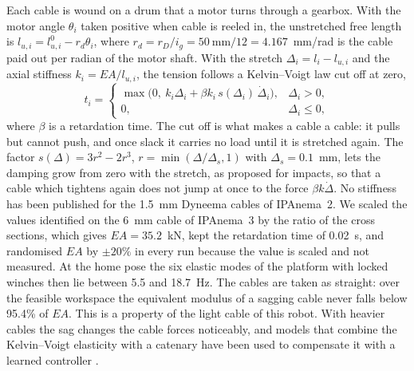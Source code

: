 \documentclass[a4paper,fleqn]{cas-dc}
\begin{document}
Each cable is wound on a drum that a motor turns through a gearbox. With the motor angle $\theta_i$ taken positive when cable is reeled in, the unstretched free length is $l_{u,i}=l^0_{u,i}-r_d\theta_i$, where $r_d=r_D/i_g=50~\text{mm}/12=4.167$~mm/rad is the cable paid out per radian of the motor shaft. With the stretch $\Delta_i=l_i-l_{u,i}$ and the axial stiffness $k_i=EA/l_{u,i}$, the tension follows a Kelvin--Voigt law cut off at zero,
\begin{equation}\label{eq:tension}
t_i=\begin{cases}\max\!\big(0,\ k_i\Delta_i+\beta k_i\,s(\Delta_i)\,\dot\Delta_i\big),&\Delta_i>0,\\ 0,&\Delta_i\le0,\end{cases}
\end{equation}
where $\beta$ is a retardation time. The cut off is what makes a cable a cable: it pulls but cannot push, and once slack it carries no load until it is stretched again. The factor $s(\Delta)=3r^2-2r^3$, $r=\min(\Delta/\Delta_s,1)$ with $\Delta_s=0.1$~mm, lets the damping grow from zero with the stretch, as \citet{hunt1975coefficient} proposed for impacts, so that a cable which tightens again does not jump at once to the force $\beta k\dot\Delta$. No stiffness has been published for the 1.5~mm Dyneema cables of IPAnema~2. We scaled the values identified on the 6~mm cable of IPAnema~3 \citep{tempel2015iftomm} by the ratio of the cross sections, which gives $EA=35.2$~kN, kept the retardation time of 0.02~s, and randomised $EA$ by $\pm20\%$ in every run because the value is scaled and not measured. At the home pose the six elastic modes of the platform with locked winches then lie between 5.5 and 18.7~Hz. The cables are taken as straight: over the feasible workspace the equivalent modulus of a sagging cable \citep{ernst1965} never falls below 95.4\% of $EA$. This is a property of the light cable of this robot. With heavier cables the sag changes the cable forces noticeably, and models that combine the Kelvin--Voigt elasticity with a catenary have been used to compensate it with a learned controller \citep{tachia2025sac}.
\end{document}
